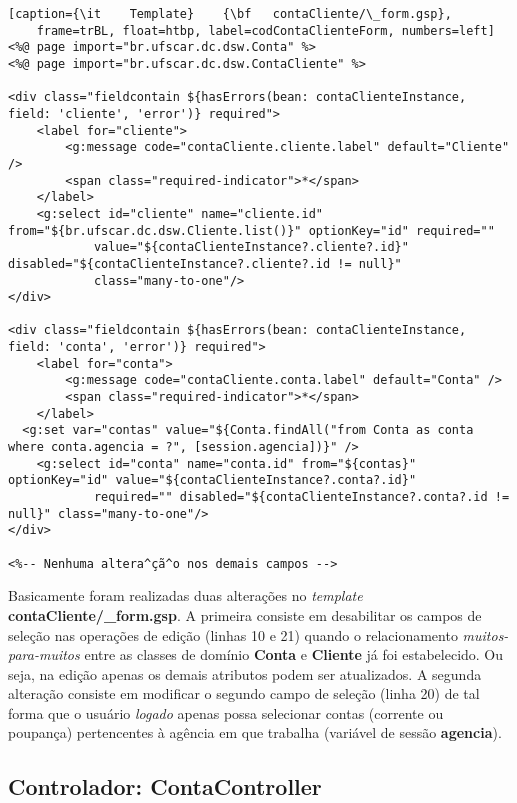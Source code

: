 \begin{lstlisting}[caption={\it    Template}    {\bf   contaCliente/\_form.gsp},
    frame=trBL, float=htbp, label=codContaClienteForm, numbers=left]
<%@ page import="br.ufscar.dc.dsw.Conta" %>
<%@ page import="br.ufscar.dc.dsw.ContaCliente" %>

<div class="fieldcontain ${hasErrors(bean: contaClienteInstance, field: 'cliente', 'error')} required">
	<label for="cliente">
		<g:message code="contaCliente.cliente.label" default="Cliente" />
		<span class="required-indicator">*</span>
	</label>
	<g:select id="cliente" name="cliente.id" from="${br.ufscar.dc.dsw.Cliente.list()}" optionKey="id" required="" 
            value="${contaClienteInstance?.cliente?.id}" disabled="${contaClienteInstance?.cliente?.id != null}" 
            class="many-to-one"/>
</div>

<div class="fieldcontain ${hasErrors(bean: contaClienteInstance, field: 'conta', 'error')} required">
	<label for="conta">
		<g:message code="contaCliente.conta.label" default="Conta" />
		<span class="required-indicator">*</span>
	</label>
  <g:set var="contas" value="${Conta.findAll("from Conta as conta where conta.agencia = ?", [session.agencia])}" />
	<g:select id="conta" name="conta.id" from="${contas}" optionKey="id" value="${contaClienteInstance?.conta?.id}" 
            required="" disabled="${contaClienteInstance?.conta?.id != null}" class="many-to-one"/>
</div>

<%-- Nenhuma altera^çã^o nos demais campos -->

\end{lstlisting}

Basicamente   foram  realizadas   duas   alterações  no   {\it  template}   {\bf
  contaCliente/\_form.gsp}.  A primeira  consiste  em desabilitar  os campos  de
seleção nas  operações de edição (linhas  10 e 21) quando  o relacionamento {\em
  muitos-para-muitos} entre as classes de domínio {\bf Conta} e {\bf Cliente} já
foi  estabelecido. Ou  seja,  na edição  apenas  os demais  atributos podem  ser
atualizados.  A segunda  alteração  consiste  em modificar  o  segundo campo  de
seleção  (linha  20) de  tal  forma  que o  usuário  {\it  logado} apenas  possa
selecionar contas (corrente ou poupança)  pertencentes à agência em que trabalha
(variável de sessão {\bf agencia}).  

\subsection{Controlador: ContaController}

